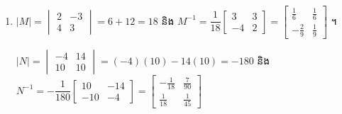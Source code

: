 \begin{enumerate}[a]
  \item $|M| = \begin{vmatrix} 2 & -3\\ 4 & 3 \end{vmatrix} = 6 + 12 = 18$ និង $M^{-1} = \dfrac{1}{18}\begin{bmatrix} 3 & 3\\ -4 & 2 \end{bmatrix} = \begin{bmatrix} \frac{1}{6} & \frac{1}{6}\\ -\frac{2}{9} & \frac{1}{9} \end{bmatrix}$ ។

  $|N| = \begin{vmatrix} -4 & 14\\ 10 & 10 \end{vmatrix} = (-4)(10) - 14(10) = -180$ និង $N^{-1} = -\dfrac{1}{180}\begin{bmatrix} 10 & -14\\ -10 & -4 \end{bmatrix} = \begin{bmatrix} -\frac{1}{18} & \frac{7}{90}\\ \frac{1}{18} & \frac{1}{45} \end{bmatrix}$


\end{enumerate}

